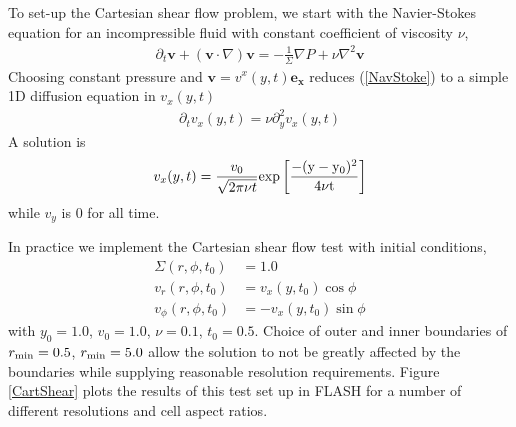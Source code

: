To set-up the Cartesian shear flow problem, we start with the Navier-Stokes equation for an incompressible fluid with constant coefficient of viscosity $\nu$,
\begin{align}
\partial_t \mathbf{v} + \left(\mathbf{v} \cdot \nabla \right) \mathbf{v} = -  \frac{1}{\Sigma} \nabla P + \nu \nabla^2 \mathbf{v}
\label{NavStoke}
\end{align}
Choosing constant pressure and $\mathbf{v} = v^x(y,t) \mathbf{e_x}$ reduces (\ref{NavStoke}) to a simple 1D diffusion equation in $v_x(y,t)$
\begin{align}
\partial_t v_x(y,t)  =  \nu \partial^2_y v_x(y,t)
\end{align}
A solution is
\begin{align}
v_x(y,t) =\frac{v_0}{\sqrt{2 \pi \nu t}} \rm{exp}\left[{\frac{-(y-y_0)^2}{4 \nu t}}\right]
\label{CShrSoln}
\end{align}
while $v_y$ is 0 for all time.

In practice we implement the Cartesian shear flow test with initial conditions,
\begin{align}
 \Sigma (r,\phi,t_0) &= 1.0  \nonumber \\
 v_r(r, \phi, t_0) &=   v_x(y, t_0) \cos{\phi} \nonumber \\
 v_\phi(r, \phi, t_0)& =   -v_x(y, t_0) \sin{\phi} 
 \end{align}
with $y_0=1.0$, $v_0=1.0$, $\nu =0.1$, $t_0 = 0.5$. Choice of outer and inner boundaries of $r_{\rm{min}}=0.5$, $r_{\rm{min}}=5.0$ allow the solution to not be greatly affected by the boundaries while supplying reasonable resolution requirements. Figure \ref{CartShear} plots the results of this test set up in FLASH for a number of different resolutions and cell aspect ratios.  



